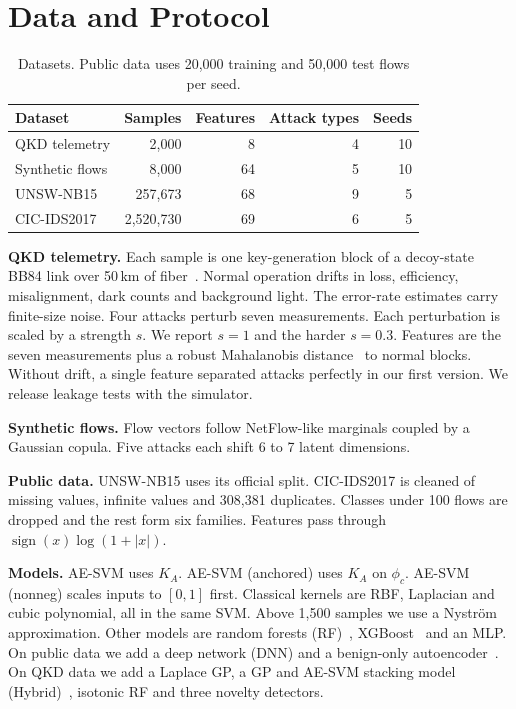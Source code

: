 \documentclass[journal]{IEEEtran}
\begin{document}
\section{Data and Protocol}
\label{sec:protocol}

\begin{table}[t]
  \centering
  \caption{Datasets. Public data uses 20,000 training and 50,000 test flows per seed.}
  \label{tab:data}
  \footnotesize
  \setlength{\tabcolsep}{2.5pt}
  \begin{tabular}{lrrrr}
    \toprule
    Dataset & Samples & Features & Attack types & Seeds \\
    \midrule
    QKD telemetry & 2,000 & 8 & 4 & 10 \\
    Synthetic flows & 8,000 & 64 & 5 & 10 \\
    UNSW-NB15 & 257,673 & 68 & 9 & 5 \\
    CIC-IDS2017 & 2,520,730 & 69 & 6 & 5 \\
    \bottomrule
  \end{tabular}
\end{table}

\textbf{QKD telemetry.} Each sample is one key-generation block of a decoy-state
BB84 link over 50\,km of fiber~\cite{lo2005decoy}. Normal operation drifts in
loss, efficiency, misalignment, dark counts and background light. The error-rate
estimates carry finite-size noise. Four attacks perturb seven measurements. Each
perturbation is scaled by a strength $s$. We report $s=1$ and the harder $s=0.3$.
Features are the seven measurements plus a robust Mahalanobis
distance~\cite{rousseeuw1999fast} to normal blocks. Without drift, a single
feature separated attacks perfectly in our first version. We release leakage
tests with the simulator.

\textbf{Synthetic flows.} Flow vectors follow NetFlow-like marginals coupled by a
Gaussian copula. Five attacks each shift 6 to 7 latent dimensions.

\textbf{Public data.} UNSW-NB15 uses its official split. CIC-IDS2017 is cleaned of
missing values, infinite values and 308,381 duplicates. Classes under 100 flows
are dropped and the rest form six families. Features pass through
$\operatorname{sign}(x)\log(1+|x|)$.

\textbf{Models.} AE-SVM uses $K_A$. AE-SVM (anchored) uses $K_A$ on $\phi_c$. AE-SVM
(nonneg) scales inputs to $[0,1]$ first. Classical kernels are RBF, Laplacian and
cubic polynomial, all in the same SVM. Above 1,500 samples we use a Nystr\"om
approximation. Other models are random forests (RF)~\cite{breiman2001random},
XGBoost~\cite{chen2016xgboost} and an MLP. On public data we add a deep network
(DNN) and a benign-only autoencoder~\cite{mirsky2018kitsune}. On QKD data we add a
Laplace GP, a GP and AE-SVM stacking model (Hybrid)~\cite{wolpert1992stacked},
isotonic RF and three novelty detectors.
\end{document}
